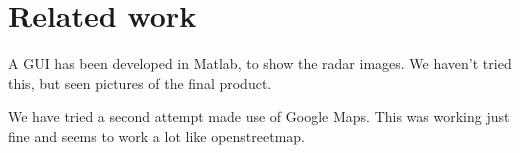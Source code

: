 \chapter{Related work}
A GUI has been developed in Matlab, to show the radar images. We haven't tried this, but seen pictures of the final product.

We have tried a second attempt made use of Google Maps. This was working just fine and seems to work a lot like openstreetmap.